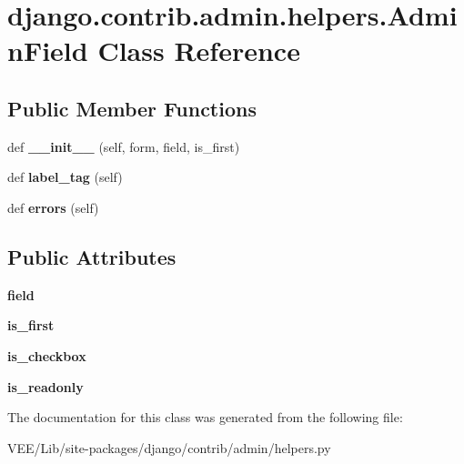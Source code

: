\hypertarget{classdjango_1_1contrib_1_1admin_1_1helpers_1_1_admin_field}{}\section{django.\+contrib.\+admin.\+helpers.\+Admin\+Field Class Reference}
\label{classdjango_1_1contrib_1_1admin_1_1helpers_1_1_admin_field}
\subsection*{Public Member Functions}
\begin{DoxyCompactItemize}
\item 
\mbox{\label{classdjango_1_1contrib_1_1admin_1_1helpers_1_1_admin_field_a5708f0b6dd380655fe5679bec391e93f}} 
def {\bfseries \+\_\+\+\_\+init\+\_\+\+\_\+} (self, form, field, is\+\_\+first)
\item 
\mbox{\label{classdjango_1_1contrib_1_1admin_1_1helpers_1_1_admin_field_ac20509cf8e77dfc8189abb8655e27cf0}} 
def {\bfseries label\+\_\+tag} (self)
\item 
\mbox{\label{classdjango_1_1contrib_1_1admin_1_1helpers_1_1_admin_field_a30dc85c417b3ef2d4f6a7ff81d12e567}} 
def {\bfseries errors} (self)
\end{DoxyCompactItemize}
\subsection*{Public Attributes}
\begin{DoxyCompactItemize}
\item 
\mbox{\label{classdjango_1_1contrib_1_1admin_1_1helpers_1_1_admin_field_a11ee6d09b4332d647c52b877cc321835}} 
{\bfseries field}
\item 
\mbox{\label{classdjango_1_1contrib_1_1admin_1_1helpers_1_1_admin_field_a044012717b6274a6172085f93c7917f0}} 
{\bfseries is\+\_\+first}
\item 
\mbox{\label{classdjango_1_1contrib_1_1admin_1_1helpers_1_1_admin_field_aaaaafbd02d4b0616cf1709d4fcd55aa7}} 
{\bfseries is\+\_\+checkbox}
\item 
\mbox{\label{classdjango_1_1contrib_1_1admin_1_1helpers_1_1_admin_field_ae689c5c9d63045bcae136d455bd359d0}} 
{\bfseries is\+\_\+readonly}
\end{DoxyCompactItemize}


The documentation for this class was generated from the following file\+:\begin{DoxyCompactItemize}
\item 
V\+E\+E/\+Lib/site-\/packages/django/contrib/admin/helpers.\+py\end{DoxyCompactItemize}
